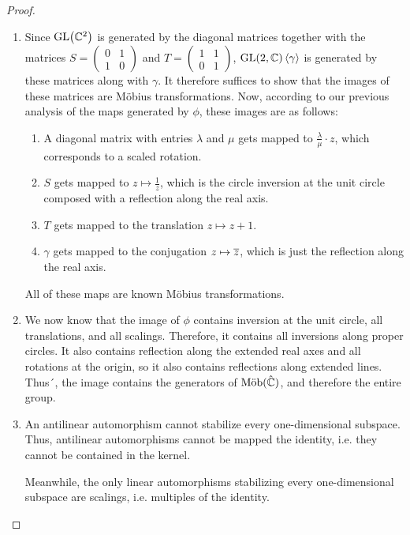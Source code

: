 \begin{proof}
	\begin{enumerate}
		\item
		Since $\textnormal{GL}\qty(\mathbb{C}^2)$ is generated by the diagonal matrices together with the matrices $S = \begin{pmatrix}
		0 & 1\\
		1 & 0
		\end{pmatrix}$ 
		and $T = \begin{pmatrix}
		1 & 1\\ 0 & 1\end{pmatrix}$, $\textnormal{GL}(2,\mathbb{C})\left\langle \gamma \right\rangle$ is generated by these matrices along with $\gamma$. It therefore suffices to show that the images of these matrices are Möbius transformations. Now, according to our previous analysis of the maps generated by $\phi$, these images are as follows:
		\begin{enumerate}
			\item A diagonal matrix with entries $\lambda$ and $\mu$ gets mapped to $\frac{\lambda}{\mu} \cdot z$, which corresponds to a scaled rotation.
			\item $S$ gets mapped to $z \mapsto \frac{1}{z}$, which is the circle inversion at the unit circle composed with a reflection along the real axis.
			\item $T$ gets mapped to the translation $z \mapsto z + 1$.
			\item $\gamma$ gets mapped to the conjugation $z \mapsto \overline{{z}}$, which is just the reflection along the real axis.
		\end{enumerate}
		All of these maps are known Möbius transformations.
		\item We now know that the image of $\phi$ contains inversion at the unit circle, all translations, and all scalings. Therefore, it contains all inversions along proper circles. It also contains reflection along the extended real axes and all rotations at the origin, so it also contains reflections along extended lines. Thus´, the image contains the generators of $\textnormal{Möb}(\hat {\mathbb{C}})$, and therefore the entire group.
		\item 
		An antilinear automorphism cannot stabilize every one-dimensional subspace. Thus, antilinear automorphisms cannot be mapped the identity, i.e. they cannot be contained in the kernel.
		
		Meanwhile, the only linear automorphisms stabilizing every one-dimensional subspace are scalings, i.e. multiples of the identity.
	\end{enumerate}
\end{proof}
